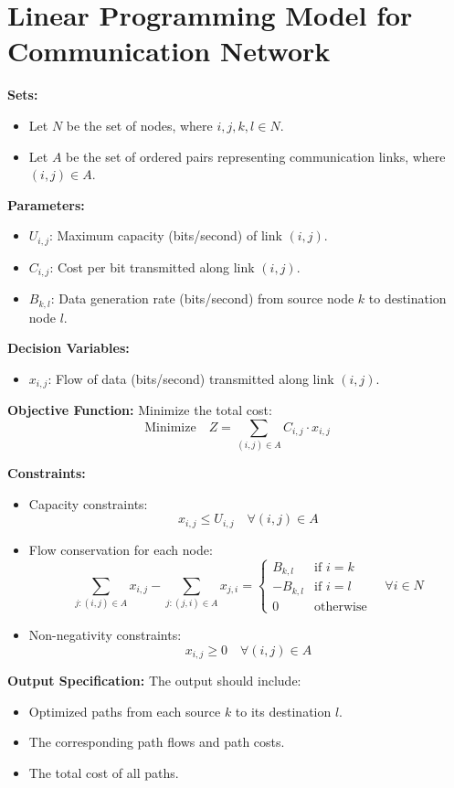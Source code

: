 \documentclass{article}
\begin{document}
\section*{Linear Programming Model for Communication Network}

\textbf{Sets:}
\begin{itemize}
    \item Let \( N \) be the set of nodes, where \( i, j, k, l \in N \).
    \item Let \( A \) be the set of ordered pairs representing communication links, where \( (i, j) \in A \).
\end{itemize}

\textbf{Parameters:}
\begin{itemize}
    \item \( U_{i,j} \): Maximum capacity (bits/second) of link \( (i,j) \).
    \item \( C_{i,j} \): Cost per bit transmitted along link \( (i,j) \).
    \item \( B_{k,l} \): Data generation rate (bits/second) from source node \( k \) to destination node \( l \).
\end{itemize}

\textbf{Decision Variables:}
\begin{itemize}
    \item \( x_{i,j} \): Flow of data (bits/second) transmitted along link \( (i,j) \).
\end{itemize}

\textbf{Objective Function:}
Minimize the total cost:
\[
\text{Minimize} \quad Z = \sum_{(i,j) \in A} C_{i,j} \cdot x_{i,j}
\]

\textbf{Constraints:}
\begin{itemize}
    \item Capacity constraints:
    \[
    x_{i,j} \leq U_{i,j} \quad \forall (i,j) \in A
    \]
    
    \item Flow conservation for each node:
    \[
    \sum_{j: (i,j) \in A} x_{i,j} - \sum_{j: (j,i) \in A} x_{j,i} = 
    \begin{cases} 
    B_{k,l} & \text{if } i = k \\
    -B_{k,l} & \text{if } i = l \\
    0 & \text{otherwise}
    \end{cases} 
    \quad \forall i \in N
    \]
    
    \item Non-negativity constraints:
    \[
    x_{i,j} \geq 0 \quad \forall (i,j) \in A
    \]
\end{itemize}

\textbf{Output Specification:}
The output should include:
\begin{itemize}
    \item Optimized paths from each source \( k \) to its destination \( l \).
    \item The corresponding path flows and path costs.
    \item The total cost of all paths.
\end{itemize}
\end{document}
